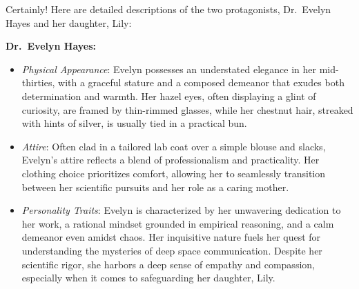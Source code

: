 \begin{aquote}
    Certainly! Here are detailed descriptions of the two protagonists, Dr.~Evelyn Hayes and her daughter, Lily:\medskip

    \noindent\textbf{Dr.~Evelyn Hayes:}
    \begin{itemize}
        \item \emph{Physical Appearance}: Evelyn possesses an understated elegance in her mid-thirties, with a graceful stature and a composed demeanor that exudes both determination and warmth. Her hazel eyes, often displaying a glint of curiosity, are framed by thin-rimmed glasses, while her chestnut hair, streaked with hints of silver, is usually tied in a practical bun.
        \item \emph{Attire}: Often clad in a tailored lab coat over a simple blouse and slacks, Evelyn's attire reflects a blend of professionalism and practicality. Her clothing choice prioritizes comfort, allowing her to seamlessly transition between her scientific pursuits and her role as a caring mother.
        \item \emph{Personality Traits}: Evelyn is characterized by her unwavering dedication to her work, a rational mindset grounded in empirical reasoning, and a calm demeanor even amidst chaos. Her inquisitive nature fuels her quest for understanding the mysteries of deep space communication. Despite her scientific rigor, she harbors a deep sense of empathy and compassion, especially when it comes to safeguarding her daughter, Lily.
    \end{itemize}
    

\end{aquote}
